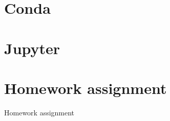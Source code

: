 
\subtitle{Installation of Python in Conda}
\date{2020-03-26}


\begin{frame}
	\tableofcontents
\end{frame}

\section{Conda}


\section{Jupyter}


\section{Homework assignment}

\begin{frame}[fragile]{Homework assignment}

\end{frame}


